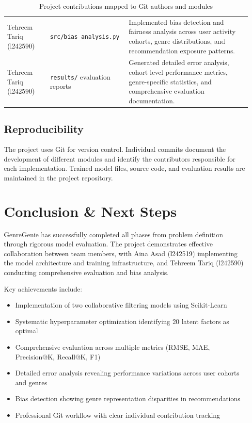 \documentclass[11pt,a4paper]{article}
\begin{document}
\begin{table}[H]
\begin{tabularx}{\textwidth}{p{3.2cm}p{4.0cm}>{\raggedright\arraybackslash}X}
Tehreem Tariq (l242590) &
\texttt{src/bias\_analysis.py} &
Implemented bias detection and fairness analysis across user activity cohorts, genre distributions, and recommendation exposure patterns. \\
\addlinespace

Tehreem Tariq (l242590) &
\texttt{results/} evaluation reports &
Generated detailed error analysis, cohort-level performance metrics, genre-specific statistics, and comprehensive evaluation documentation. \\
\bottomrule
\end{tabularx}
\caption{Project contributions mapped to Git authors and modules}
\label{tab:contributions}
\end{table}
\subsection{Reproducibility}

The project uses Git for version control. Individual commits
document the development of different modules and identify
the contributors responsible for each implementation.
Trained model files, source code, and evaluation results are
maintained in the project repository.


\section{Conclusion \& Next Steps}

GenreGenie has successfully completed all phases from problem definition through rigorous model evaluation. The project demonstrates effective collaboration between team members, with Aina Asad (l242519) implementing the model architecture and training infrastructure, and Tehreem Tariq (l242590) conducting comprehensive evaluation and bias analysis.

Key achievements include:
\begin{itemize}
    \item Implementation of two collaborative filtering models using Scikit-Learn
    \item Systematic hyperparameter optimization identifying 20 latent factors as optimal
    \item Comprehensive evaluation across multiple metrics (RMSE, MAE, Precision@K, Recall@K, F1)
    \item Detailed error analysis revealing performance variations across user cohorts and genres
    \item Bias detection showing genre representation disparities in recommendations
    \item Professional Git workflow with clear individual contribution tracking
\end{itemize}
\end{document}
